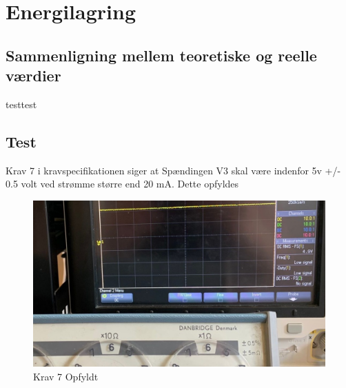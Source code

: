\documentclass[../main.tex]{subfiles}
\begin{document}
\chapter{Energilagring } \label{Chap:Energilagring}

\section{Sammenligning mellem teoretiske og reelle værdier}
testtest

\section{Test}
Krav 7 i kravspecifikationen siger at Spændingen V3 skal være indenfor 5v +/- 0.5 volt ved strømme større end 20 mA. Dette opfyldes 

\begin{figure}[H]
      \includegraphics[width=\textwidth]{Dokumentation/Pictures/Krav7.jpg}
     \caption{Krav 7 Opfyldt}
     \label{fig: Krav 7 Opfyldt}
     \end{figure}
\end{document}
